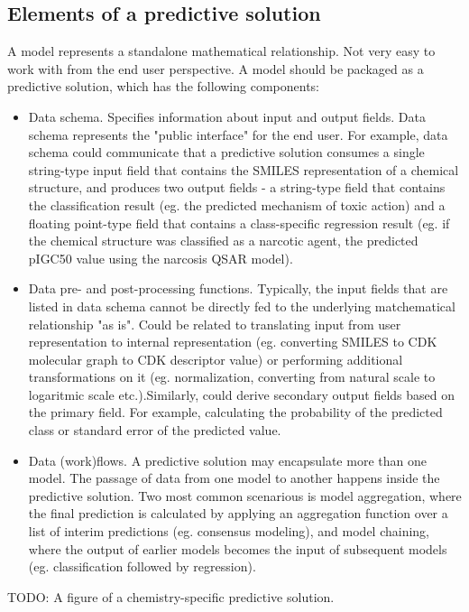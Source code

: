 \documentclass[12pt,letterpaper]{article}
\begin{document}
\subsection{Elements of a predictive solution}

A model represents a standalone mathematical relationship. Not very easy
to work with from the end user perspective. A model should be packaged
as a predictive solution, which has the following components:
\begin{itemize}
  \item Data schema. Specifies information about input and output fields.
  Data schema represents the "public interface" for the end user. 
  For example, data schema could communicate that a predictive solution
  consumes a single string-type input field that contains the SMILES 
  representation of a chemical structure, and produces two output fields - 
  a string-type field that contains the classification result (eg. the 
  predicted mechanism of toxic action) and a floating point-type field 
  that contains a class-specific regression result (eg. if the chemical
  structure was classified as a narcotic agent, the predicted pIGC50 
  value using the narcosis QSAR model).
  \item Data pre- and post-processing functions. Typically, the input
  fields that are listed in data schema cannot be directly fed to the 
  underlying matchematical relationship "as is". Could be related to 
  translating input from user representation to internal representation
  (eg. converting SMILES to CDK molecular graph to CDK descriptor value)
  or performing additional transformations on it (eg. normalization, 
  converting from natural scale to logaritmic scale etc.).Similarly,
  could derive secondary output fields based on the primary field. For
  example, calculating the probability of the predicted class or standard
  error of the predicted value.
  \item Data (work)flows. A predictive solution may encapsulate more
  than one model. The passage of data from one model to another happens
  inside the predictive solution. Two most common scenarious is model 
  aggregation, where the final prediction is calculated by applying an
  aggregation function over a list of interim predictions (eg. consensus
  modeling), and model chaining, where the output of earlier models
  becomes the input of subsequent models (eg. classification followed 
  by regression).
\end{itemize}

TODO: A figure of a chemistry-specific predictive solution.
\end{document}
